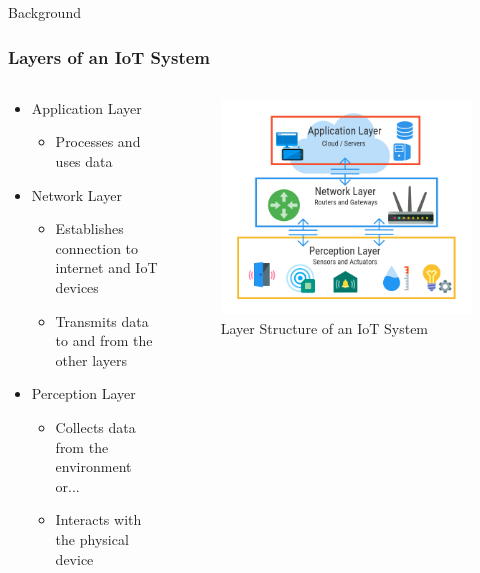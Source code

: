 \documentclass{beamer}
\begin{document}
\begin{frame}{Background}
  \frametitle{Layers of an IoT System}
  \begin{columns}
    \begin{column}{0.6\textwidth}
      \begin{itemize}
        \item Application Layer
          \begin{itemize}
            \item Processes and uses data
          \end{itemize}
        \item Network Layer
          \begin{itemize}
            \item Establishes connection to internet and IoT devices
            \item Transmits data to and from the other layers
          \end{itemize}
        \item Perception Layer
          \begin{itemize}
            \item Collects data from the environment or...
            \item Interacts with the physical device
          \end{itemize}
      \end{itemize}
    \end{column}
    \begin{column}{0.4\textwidth}
      \begin{figure}[htbp]
        \centering
        \includegraphics[width=\textwidth]{three-layer-iot-architecture.png}
        \caption{Layer Structure of an IoT System \cite{Calihman_2021}}
        \label{fig:IoT_Layers}
      \end{figure}
  \end{column}
  \end{columns}
\end{frame}
\end{document}
